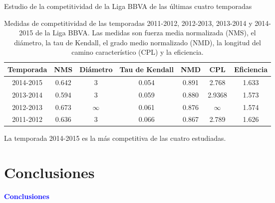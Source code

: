 \documentclass[10pt,hyperref={unicode}]{beamer}
\begin{document}
	
	\begin{frame}{Estudio de la competitividad de la Liga BBVA de las últimas cuatro temporadas}	

		\begin{table}[h]
			\centering
			\caption[Medidas de competitividad de las últimas cuatro temporadas]{Medidas de competitividad de las temporadas 2011-2012, 2012-2013, 2013-2014 y 2014-2015 de la Liga BBVA. Las medidas son fuerza media normalizada (NMS), el diámetro, la tau de Kendall, el grado medio normalizado (NMD), la longitud del camino característico (CPL) y la eficiencia.}
			\label{tbl:medidas}
			\begin{adjustbox}{max width=\textwidth}
			\begin{tabular}{@{}ccccccc@{}}
				\toprule
				Temporada & NMS & Diámetro & Tau de Kendall & NMD & CPL & Eficiencia \\ \midrule
				2014-2015 & 0.642                    & 3        & 0.054          & 0.891                   & 2.768                              & 1.633      \\
				2013-2014 & 0.594                    & 3        & 0.059          & 0.880                   & 2.9368                             & 1.573      \\
				2012-2013 & 0.673                    & $\infty$ & 0.061          & 0.876                   & $\infty$                           & 1.574      \\
				2011-2012 & 0.636                    & 3        & 0.066          & 0.867                   & 2.789                              & 1.626      \\ \bottomrule
			\end{tabular}
			\end{adjustbox}
		\end{table}
		
		La temporada 2014-2015 es la más competitiva de las cuatro estudiadas.
		
	\end{frame}
	
	\section{Conclusiones}
		
		\begin{frame}
			\begin{center}
				\Huge\textbf{\textsf{\textcolor{blue}{Conclusiones}}}
			\end{center}
		\end{frame}
		
\end{document}
